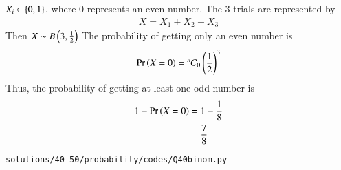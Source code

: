 $X_i \in \left\{0,1\right\}$, where 0 represents an even number. 
The 3 trials are represented by
\begin{align}
X = X_1+X_2+X_3
\end{align}
Then $X \sim B\left(3,\frac{1}{2}\right)$
The probability of getting only an even number is
\begin{align}
\Pr\left(X=0\right) = {{}^{n}\mkern-1muC_{0}}\left(\frac{1}{2}\right)^3
\end{align}
Thus, the probability of getting at least one odd number is 
\begin{align}
1- \Pr\left(X=0\right)&=1 - \frac{1}{8}
\\
&= \frac{7}{8}
\end{align}
\begin{lstlisting}
solutions/40-50/probability/codes/Q40binom.py
\end{lstlisting}

